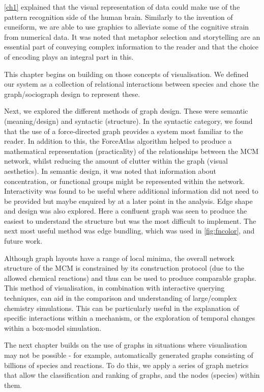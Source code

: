 \autoref{ch1} explained that the visual representation of data could make use of the pattern recognition side of the human brain. Similarly to the invention of cuneiform, we are able to use graphics to alleviate some of the cognitive strain from numerical data. It was noted that metaphor selection and storytelling are an essential part of conveying complex information to the reader and that the choice of encoding plays an integral part in this. 

This chapter begins on building on those concepts of visualisation. We defined our system as a collection of relational interactions between species and chose the graph/sociograph design to represent these. 

Next, we explored the different methods of graph design. These were semantic (meaning/design) and syntactic (structure). In the syntactic category, we found that the use of a force-directed graph provides a system most familiar to the reader. In addition to this, the ForceAtlas algorithm helped to produce a mathematical representation (practicality) of the relationships between the MCM network, whilst reducing the amount of clutter within the graph (visual aesthetics). In semantic design, it was noted that information about concentration, or functional groups might be represented within the network. Interactivity was found to be useful where additional information did not need to be provided but maybe enquired by at a later point in the analysis. Edge shape and design was also explored. Here a confluent graph was seen to produce the easiest to understand the structure but was the most difficult to implement. The next most useful method was edge bundling, which was used in \autoref{fig:fncolor}, and future work.

Although graph layouts have a range of local minima, the overall network structure of the MCM is constrained by its construction protocol (due to the allowed chemical reactions) and thus can be used to produce comparable graphs. This method of visualisation, in combination with interactive querying techniques, can aid in the comparison and understanding of large/complex chemistry simulations. This can be particularly useful in the explanation of specific interactions within a mechanism, or the exploration of temporal changes within a box-model simulation. 

The next chapter builds on the use of graphs in situations where visualisation may not be possible - for example, automatically generated graphs consisting of billions of species and reactions. To do this, we apply a series of graph metrics that allow the classification and ranking of graphs, and the nodes (species) within them.